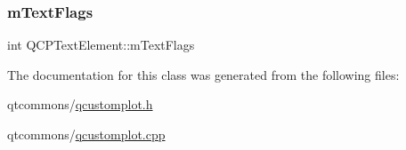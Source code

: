 \subsubsection{\texorpdfstring{mTextFlags}{mTextFlags}}
{\footnotesize\ttfamily int Q\+C\+P\+Text\+Element\+::m\+Text\+Flags\hspace{0.3cm}{\ttfamily [protected]}}



The documentation for this class was generated from the following files\+:\begin{DoxyCompactItemize}
\item 
qtcommons/\mbox{\hyperlink{qcustomplot_8h}{qcustomplot.\+h}}\item 
qtcommons/\mbox{\hyperlink{qcustomplot_8cpp}{qcustomplot.\+cpp}}\end{DoxyCompactItemize}
